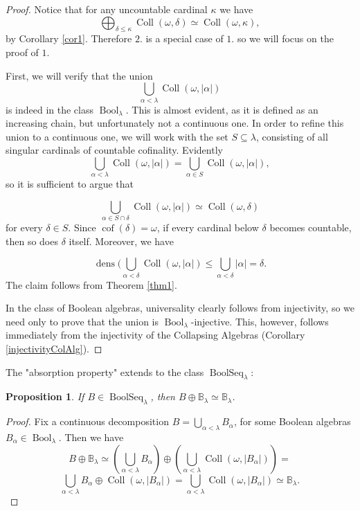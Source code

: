 \documentclass[11pt]{amsart}
\newtheorem{prop}[thm]{Proposition}
\theoremstyle{definition}
\DeclareMathOperator{\dens}{dens}
\DeclareMathOperator{\Bool}{Bool}
\DeclareMathOperator{\BoolSeq}{BoolSeq}
\newcommand{\blim}{\mathbb{B}_\lambda}
\newcommand{\col}{\operatorname{Coll}}
\newcommand{\collkappa}{\operatorname{Coll}(\omega,\kappa)}
\begin{document}
\begin{proof}
	Notice that for any uncountable cardinal $\kappa$ we have
    $$\bigoplus_{\delta\leq \kappa} \operatorname{Coll}(\omega,\delta)\simeq\collkappa,$$
    by Corollary \ref{cor1}. Therefore $2.$ is a special case of $1.$ so we will focus on the proof of $1.$

    First, we will verify that the union
    $$\bigcup_{\alpha<\lambda} \operatorname{Coll}(\omega,|\alpha|)$$
    is indeed in the class $\Bool_\lambda$. This is almost evident, as it is defined as an increasing chain, but unfortunately not a continuous one. In order to refine this union to a continuous one, we will work with the set $S \subseteq \lambda$, consisting of all singular cardinals of countable cofinality. Evidently
    $$\bigcup_{\alpha<\lambda} \operatorname{Coll}(\omega,|\alpha|)=\bigcup_{\alpha\in S} \operatorname{Coll}(\omega,|\alpha|),$$
    so it is sufficient to argue that
    
    $$\bigcup_{\alpha \in S\cap \delta} \operatorname{Coll}(\omega,|\alpha|)\simeq\col(\omega,\delta)$$  
    for every $\delta \in S$. 
    Since $\operatorname{cof}(\delta)=\omega$, if every cardinal below $\delta$ becomes countable, then so does $\delta$ itself. Moreover, we have
    
    $$\dens(\bigcup_{\alpha<\delta} \operatorname{Coll}(\omega,|\alpha|)\leq \bigcup\limits_{\alpha<\delta}|\alpha|=\delta.$$ 
    The claim follows from Theorem \ref{thm1}.

    In the class of Boolean algebras, universality clearly follows from injectivity, so we need only to prove that the union is $\Bool_\lambda$-injective. This, however, follows immediately from the injectivity of the Collapsing Algebras (Corollary \ref{injectivityColAlg}).
\end{proof}

The "absorption property" extends to the class $\BoolSeq_\lambda$:

\begin{prop}\label{absorption}
    If $B\in \BoolSeq_\lambda$, then $B\oplus \blim\simeq \blim$.
\end{prop}
\begin{proof}
    Fix a continuous decomposition $B=\bigcup\limits_{\alpha<\lambda}B_\alpha$, for some Boolean algebras $B_\alpha \in \Bool_\lambda$. Then we have
    $$B \oplus \blim \simeq (\bigcup_{\alpha<\lambda}B_\alpha) \oplus (\bigcup_{\alpha<\lambda} \operatorname{Coll}(\omega,|B_\alpha|)) =$$
	$$\bigcup_{\alpha<\lambda}B_\alpha \oplus \operatorname{Coll}(\omega,|B_\alpha|)=\bigcup_{\alpha<\lambda}\operatorname{Coll}(\omega,|B_\alpha|)\simeq \blim.$$
\end{proof}
\end{document}
